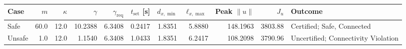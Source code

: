 \begin{tabular}{@{}lrrrrrrrrrl@{}}\toprule
Case & $m$ & $\kappa$ & $\gamma$ & $\gamma_{\mathrm{req}}$ & $t_{\mathrm{set}}$ [s] & $d_{x,\min}$ & $\ell_{x,\max}$ & Peak $\|u\|$ & $J_u$ & Outcome \\\midrule
Safe & 60.0 & 12.0 & 10.2388 & 6.3408 & 0.2417 & 1.8351 & 5.8880 & 148.1963 & 3803.88 & Certified; Safe, Connected \\
Unsafe & 1.0 & 12.0 & 1.1540 & 6.3408 & 1.0433 & 1.8351 & 6.2417 & 108.2098 & 3790.96 & Uncertified; Connectivity Violation \\
\bottomrule\end{tabular}
